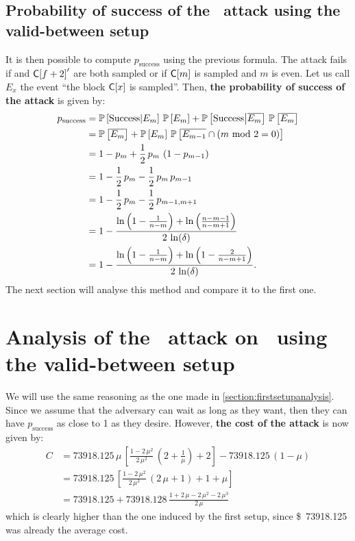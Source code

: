\subsection{Probability of success of the \cs\ attack using the valid-between setup}

It is then possible to compute \(p_{\text{success}}\) using the previous formula. The attack fails if  and \(\mathsf{C[}f+2\mathsf{]}'\) are both sampled or if \(\mathsf{C[}m\mathsf{]}\) is sampled and \(m\) is even. Let us call \(E_x\) the event \enquote{the block \(\mathsf{C[}x\mathsf{]}\) is sampled}. Then, \textbf{the probability of success of the attack} is given by:
\begin{align*}
    p_{\text{success}} &= \mathbb{P}\left[\text{Success}\middle|E_{m}\right]\,\mathbb{P}\left[E_{m}\right] + \mathbb{P}\left[\text{Success}\middle|\overline{E_{m}}\right]\,\mathbb{P}\left[\overline{E_{m}}\right]\\
    &= \mathbb{P}\left[\overline{E_{m}}\right] + \mathbb{P}\left[E_{m}\right]\,\mathbb{P}\left[\overline{E_{m-1}}\cap\left(m\ \mathrm{mod}\ 2=0\right)\right]\\
    &= 1 - p_{m} + \frac12\,p_{m}\,\left(1-p_{m-1}\right)\\
    &= 1 - \frac12\,p_{m} - \frac12\,p_{m}\,p_{m-1}\\
    &= 1 - \frac12\,p_{m} - \frac12\,p_{m-1,m+1}\\
    &= 1 - \frac{\ln\left(1 - \frac{1}{n - m}\right) + \ln\left(\frac{n - m-1}{n - m+1}\right)}{2\,\ln(\delta)}\\
    &= 1 - \frac{\ln\left(1 - \frac{1}{n - m}\right) + \ln\left(1-\frac{2}{n - m+1}\right)}{2\,\ln(\delta)}.
\end{align*}
The next section will analyse this method and compare it to the first one.

\section{Analysis of the \cs\ attack on \FC\ using the valid-between setup}
We will use the same reasoning as the one made in \autoref{section:firstsetupanalysis}. Since we assume that the adversary can wait as long as they want, then they can have \(p_{\text{success}}\) as close to 1 as they desire. However, \textbf{the cost of the attack} is now given by:
\begin{align*}
    C &= \num{73918.125}\,\mu\,\left[\frac{1-2\,\mu^2}{2\,\mu^2}\,\left(2+\frac{1}{\mu}\right)+2\right] - \num{73918.125}\,(1-\mu) \\
    &= \num{73918.125}\,\left[\frac{1-2\,\mu^2}{2\,\mu^3}\,\left(2\,\mu+1\right)+1+\mu\right]\\
    &= \num{73918.125} + \num{73918.128}\,\frac{1+2\,\mu-2\,\mu^2-2\,\mu^3}{2\,\mu}
\end{align*}
which is clearly higher than the one induced by the first setup, since \SI{73918.125}[\$]{} was already the average cost.

